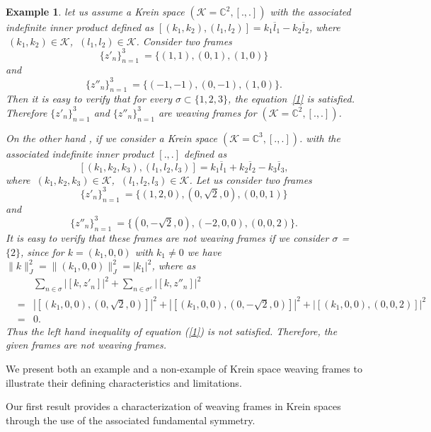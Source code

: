 \documentclass[article,12pt]{amsart}
\newtheorem{ex}[thm]{Example}
\begin{document}
\begin{ex}
let us assume a Krein space $(\mathcal K = \mathbb C^2, [.,.])$ with the associated indefinite inner product defined as $[(k_1 , k_2), (l_1,  l_2)] = k_1\overline l_1 - k_2\overline l_2$, where $\ (k_1, k_2)  \in {\mathcal K}$, $\ (l_1, l_2) \in {\mathcal K}$. Consider two frames 
$$
\{z'_n\}_{n=1}^3\ = \{(1, 1), (0, 1), (1, 0) \}$$ and $$\{z''_n\}_{n= 1}^3\ = \{(-1, -1), (0, -1), (1, 0) \}.
$$ Then it is easy to verify that for every $\sigma \subset \{1, 2, 3\}$, the equation~\eqref{1} is satisfied. Therefore $\{z'_n\}_{n = 1}^3$ and $\{z''_n\}_{n = 1}^3$ are weaving frames for $(\mathcal K = \mathbb C^2, [.,.])$.


On the other hand , if we consider a Krein space  $(\mathcal K = \mathbb C^3, [.,.])$. with the associated indefinite inner product $[. , .]$ defined as 
$$
[ (k_1, k_2, k_3 ), (l_1, l_2, l_3 )] = k_1\overline l_1 + k_2\overline l_2 - k_3\overline l_3,
$$ where $\ (k_1, k_2, k_3) \in {\mathcal K}$, $\ (l_1, l_2, l_3) \in {\mathcal K}$. Let us consider two frames 
$$
\{z'_n\}_{n=1}^3\ = \{(1, 2, 0), (0, \sqrt{2}, 0), (0, 0, 1) \}
$$ and 
$$
\{z''_n\}_{n= 1}^3\ = \{(0, -\sqrt{2}, 0), (-2, 0, 0), (0, 0, 2) \}.
$$
 It is easy to verify that these frames are not weaving frames if we consider $\sigma$ = $\{2\}$, since for $k =(k_1, 0, 0)$ with $k_1 \neq 0$ we have  $\|k\|_{J}^2 =  \|(k_1, 0,0)\|_{J}^2 = |k_1|^2$, where as 
\begin{eqnarray*}
&&\sum\limits_{n \in \sigma} |[k, z'_n]|^2 + \sum\limits_{n \in \sigma^c} |[k, z''_n]|^2 \\&=& |[(k_1, 0, 0), (0, \sqrt{2}, 0)]|^2
+|[(k_1, 0, 0), (0, -\sqrt{2}, 0)]|^2
 + |[(k_1, 0, 0), (0, 0, 2)]|^2 
\\&=& 0.
\end{eqnarray*}
 Thus the left hand inequality of equation (\ref{1}) is not satisfied.
Therefore, the given frames are not weaving frames.


\end{ex}We present both an example and a non-example of Krein space weaving frames to illustrate their defining characteristics and limitations.



Our first result provides a characterization of weaving frames in Krein spaces through the use of the associated fundamental symmetry.
\end{document}
